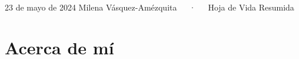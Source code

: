 \documentclass[11pt,a4paper,]{awesome-cv}
\begin{document}
\makecvheader

\makecvfooter
  {23 de mayo de 2024}
    {Milena Vásquez-Amézquita~~~·~~~Hoja de Vida Resumida}
  {\thepage}





\hypertarget{acerca-de-muxed}{%
\section{Acerca de mí}\label{acerca-de-muxed}}
\end{document}
